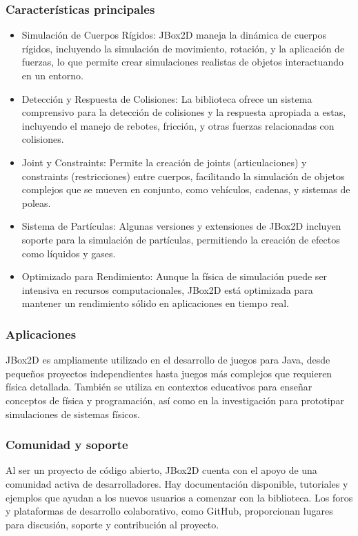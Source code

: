 \subsubsection{Características principales}
\begin{itemize}
    \item Simulación de Cuerpos Rígidos: JBox2D maneja la dinámica de cuerpos rígidos, incluyendo la simulación de movimiento, rotación, y la aplicación de fuerzas, lo que permite crear simulaciones realistas de objetos interactuando en un entorno.
    \item Detección y Respuesta de Colisiones: La biblioteca ofrece un sistema comprensivo para la detección de colisiones y la respuesta apropiada a estas, incluyendo el manejo de rebotes, fricción, y otras fuerzas relacionadas con colisiones.
    \item Joint y Constraints: Permite la creación de joints (articulaciones) y constraints (restricciones) entre cuerpos, facilitando la simulación de objetos complejos que se mueven en conjunto, como vehículos, cadenas, y sistemas de poleas.
    \item Sistema de Partículas: Algunas versiones y extensiones de JBox2D incluyen soporte para la simulación de partículas, permitiendo la creación de efectos como líquidos y gases.
    \item Optimizado para Rendimiento: Aunque la física de simulación puede ser intensiva en recursos computacionales, JBox2D está optimizada para mantener un rendimiento sólido en aplicaciones en tiempo real.
\end{itemize}
\subsubsection{Aplicaciones}
JBox2D es ampliamente utilizado en el desarrollo de juegos para Java, desde pequeños proyectos independientes hasta juegos más complejos que requieren física detallada. También se utiliza en contextos educativos para enseñar conceptos de física y programación, así como en la investigación para prototipar simulaciones de sistemas físicos.
\subsubsection{Comunidad y soporte}
Al ser un proyecto de código abierto, JBox2D cuenta con el apoyo de una comunidad activa de desarrolladores. Hay documentación disponible, tutoriales y ejemplos que ayudan a los nuevos usuarios a comenzar con la biblioteca. Los foros y plataformas de desarrollo colaborativo, como GitHub, proporcionan lugares para discusión, soporte y contribución al proyecto.


